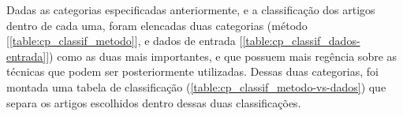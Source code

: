 Dadas as categorias especificadas anteriormente, e a classificação dos artigos dentro de cada uma, foram elencadas duas categorias (método [\cref{table:cp_classif_metodo}], e dados de entrada [\cref{table:cp_classif_dados-entrada}]) como as duas mais importantes, e que possuem mais regência sobre as técnicas que podem ser posteriormente utilizadas. Dessas duas categorias, foi montada uma tabela de classificação (\cref{table:cp_classif_metodo-vs-dados}) que separa os artigos escolhidos dentro dessas duas classificações.


